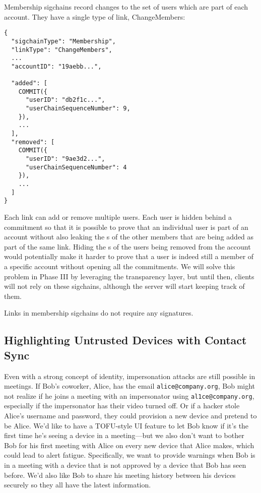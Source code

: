 Membership sigchains record changes to the set of users which are part of each account. They
have a single type of link, \textsf{ChangeMembers}:

\begin{Verbatim}
{
  "sigchainType": "Membership",
  "linkType": "ChangeMembers",
  ...
  "accountID": "19aebb...",

  "added": [
    COMMIT({
      "userID": "db2f1c...",
      "userChainSequenceNumber": 9,
    }),
    ...
  ],
  "removed": [
    COMMIT({
      "userID": "9ae3d2...",
      "userChainSequenceNumber": 4
    }),
    ...
  ]
}
\end{Verbatim}

Each link can add or remove multiple users. Each user is hidden behind a commitment so that it is
possible to prove that an individual user is part of an account without also leaking the {\userID}s
of the other members that are being added as part of the same link. Hiding the {\userID}s of the
users being removed from the account would potentially make it harder to prove that a user is indeed
still a member of a specific account without opening all the commitments. We will solve this problem
in Phase III by leveraging the transparency layer, but until then, clients will not rely on
these sigchains, although the server will start keeping track of them.

Links in membership sigchains do not require any signatures.

\subsection{Highlighting Untrusted Devices with Contact Sync}
\label{subsec:contactsync}

Even with a strong concept of identity, impersonation attacks are still possible in meetings. If
Bob's coworker, Alice, has the email \texttt{alice@company.org}, Bob might not realize if he joins a
meeting with an impersonator using \texttt{al1ce@company.org}, especially if the impersonator has
their video turned off. Or if a hacker stole Alice's username and password, they could provision a
new device and pretend to be Alice. We'd like to have a TOFU-style UI feature to let Bob know if
it's the first time he's seeing a device in a meeting---but we also don't want to bother Bob for his
first meeting with Alice on every new device that Alice makes, which could lead to alert fatigue.
Specifically, we want to provide warnings when Bob is in a meeting with a device that is not
approved by a device that Bob has seen before. We'd also like Bob to share his meeting history
between his devices securely so they all have the latest information.

